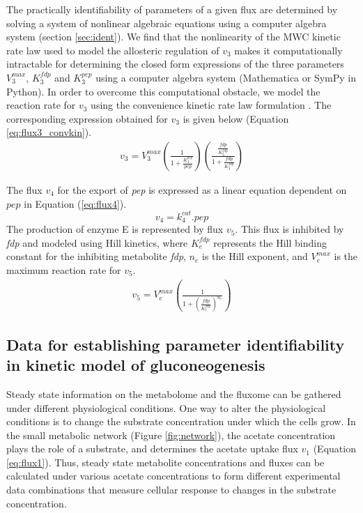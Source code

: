 \documentclass[10pt]{article}
\begin{document}
	The practically identifiability of parameters of a given flux are determined by solving a system of nonlinear algebraic equations using a computer algebra system (section \ref{sec:ident}). We find that the nonlinearity of the MWC kinetic rate law used to model the allosteric regulation of $v_3$ makes it computationally intractable for determining the closed form expressions of the three parameters $V_3^{max}$, $K_3^{fdp}$ and $K_3^{pep}$ using a computer algebra system (Mathematica or SymPy in Python). In order to overcome this computational obstacle, we model the reaction rate for $v_3$ using the convenience kinetic rate law formulation \parencite{Liebermeister2006}. The corresponding expression obtained for $v_3$ is given below (Equation \ref{eq:flux3_convkin}). 	
	\begin{align}\label{eq:flux3_convkin}
	v_3 = V_3^{max}\left(\frac{1}{1 + \frac{K_3^{pep}}{pep}}\right)\left(\frac{\frac{fdp}{K_3^{fdp}}}{1 + \frac{fdp}{K_3^{fdp}}}\right)
	\end{align}	
	
	The flux $v_4$ for the export of \textit{pep} is expressed as a linear equation dependent on $pep$ in Equation (\ref{eq:flux4}).
	\begin{equation}\label{eq:flux4}
	v_4 = k_{4}^{cat}.pep
	\end{equation}		
	The production of enzyme E is represented by flux $v_5$. This flux is inhibited by \textit{fdp} and modeled using Hill kinetics, where $K_e^{fdp}$ represents the Hill binding constant for the inhibiting metabolite \textit{fdp}, $n_e$ is the Hill exponent, and $V_e^{max}$ is the maximum reaction rate for $v_5$.
	\begin{align}\label{eq:flux5}
	v_5 = V_e^{max}\left(\frac{1}{1+\left(\frac{fdp}{K_{e}^{fdp}}\right)^{n_e}}\right)
	\end{align}
	
	\subsection{Data for establishing parameter identifiability in kinetic model of gluconeogenesis}\label{sec:experiments}
	Steady state information on the metabolome and the fluxome can be gathered under different physiological conditions. One way to alter the physiological conditions is to change the substrate concentration under which the cells grow. In the small metabolic network (Figure \ref{fig:network}), the acetate concentration plays the role of a substrate, and  determines the acetate uptake flux $v_1$ (Equation \ref{eq:flux1}). Thus, steady state metabolite concentrations and fluxes can be calculated under various acetate concentrations to form different experimental data combinations that measure cellular response to changes in the substrate concentration. 
	
\end{document}

